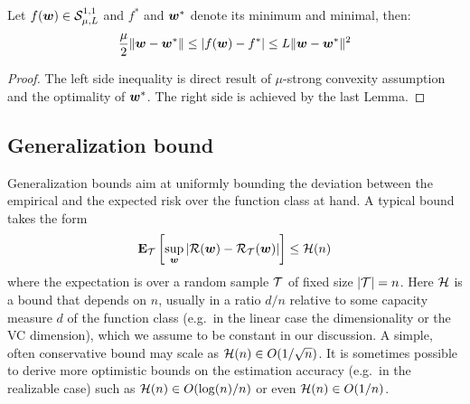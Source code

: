 \begin{corollary} \label{corollary:smoothstrongbound}
	Let $f(\bm{w}) \in {\cal S}_{\mu,L}^{1,1}$ and $f^*$ and $\bm{w}^*$ denote its minimum and
	minimal, then: 
	\begin{equation*}
		\frac{\mu}{2} \| \bm{w} - \bm{w}^*  \| \leq | f(\bm{w}) - f^* | \leq L \| \bm{w} - \bm{w}^* \|^2
	\end{equation*}
\end{corollary}
\begin{proof}
	The left side inequality is direct result of $\mu$-strong convexity
	assumption and the optimality of $\bm{w}^*$. The right side is achieved by
	the last Lemma.
\end{proof}

\subsection{Generalization bound}
Generalization bounds aim at uniformly bounding the deviation between the empirical and the expected risk over the function class at hand. A typical bound takes the form
\begin{equation*}
\mathbf{E}_{\cal T} \left[ \sup_{\bm{w}} \left| {\cal R}(\bm{w}) - {\cal R}_{\cal T}(\bm{w}) \right| \right]  \leq
{\cal H}(n) \label{eq:bound}
\end{equation*} 
where the expectation is over a random sample ${\cal T}$ of fixed size $|{\cal T}|=n$. 
Here ${\cal H}$ is a bound that depends on $n$, usually in a ratio $d/n$ relative
to some capacity measure $d$ of the function class (e.g.~in the linear case the dimensionality or the VC dimension), which we assume to be constant in our discussion.  
A simple, often conservative bound may scale as ${\cal H}(n) \in O(1/\sqrt{n})$. 
It is sometimes possible to derive more optimistic bounds on the estimation accuracy (e.g.~in the realizable case) 
such as ${\cal H}(n) \in O(\log(n)/n)$ or even ${\cal H}(n) \in O(1/n)$. 

